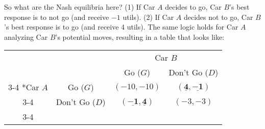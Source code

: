 So what are the Nash equilibria here? (1) If Car $A$ decides to go, Car $B$'s best response is to not go (and receive $-1$ utils). (2) If Car $A$ decides not to go, Car $B$'s best response is to go (and receive 4 utils). The same logic holds for Car $A$ analyzing Car $B$'s potential moves, resulting in a table that looks like:
\begin{table}[ht!]
    \centering
    \setlength{\extrarowheight}{2pt}
    \begin{tabular}{cc|c|c|}
      & \multicolumn{1}{c}{} & \multicolumn{2}{c}{Car $B$}\\
      & \multicolumn{1}{c}{} & \multicolumn{1}{c}{Go ($G$)}  & \multicolumn{1}{c}{Don't Go ($D$)} \\\cline{3-4}
      \multirow{2}*{Car $A$}  & Go ($G$) & $(-10,-10)$ & $(\underline{\mathbf{4}},\underline{\mathbf{-1}})$ \\\cline{3-4}
      & Don't Go ($D$) & $(\underline{\mathbf{-1}},\underline{\mathbf{4}})$ & $(-3,-3)$ \\\cline{3-4}
    \end{tabular}
\label{fig:slnash}
\end{table}
